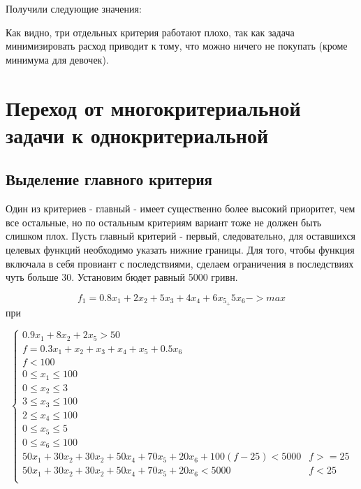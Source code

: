 \documentclass[14pt,a4paper,report]{report}
\begin{document}


Получили следующие значения:


Как видно, три отдельных критерия работают плохо, так как задача минимизировать расход приводит к тому, что можно ничего не покупать (кроме минимума для девочек).









\section{Переход от многокритериальной задачи к однокритериальной}
\subsection{Выделение главного критерия}


Один из критериев - главный - имеет существенно более высокий приоритет, чем все остальные, но по остальным критериям вариант тоже не должен быть слишком плох. Пусть главный критерий - первый, следовательно, для оставшихся целевых функций необходимо указать нижние границы. Для того, чтобы функция включала в себя провиант с последствиями, сделаем ограничения в последствиях чуть больше 30. Установим бюдет равный 5000 гривн.


$$ f_1 = 0.8x_1+2x_2+5x_3+4x_4+6x_5_+5x_6 -> max$$
 при

\begin{equation*}
 \begin{cases}
    0.9x_1+8x_2+2x_5 > 50\\
     f = 0.3x_1+x_2+x_3+x_4+x_5+0.5x_6  \\
     f<100 \\
     0 \leq x_1 \leq 100  \\
     0 \leq x_2 \leq 3   \\
     3 \leq x_3 \leq 100   \\
     2 \leq x_4 \leq 100   \\
     0 \leq x_5 \leq 5  \\
     0 \leq x_6 \leq 100   \\
     50x_1+30x_2+30x_2+50x_4+70x_5+20x_6 + 100(f-25) < 5000  & f>=25 \\
          50x_1+30x_2+30x_2+50x_4+70x_5+20x_6 < 5000  & f<25 \\
     
 \end{cases}
\end{equation*}
\end{document}
